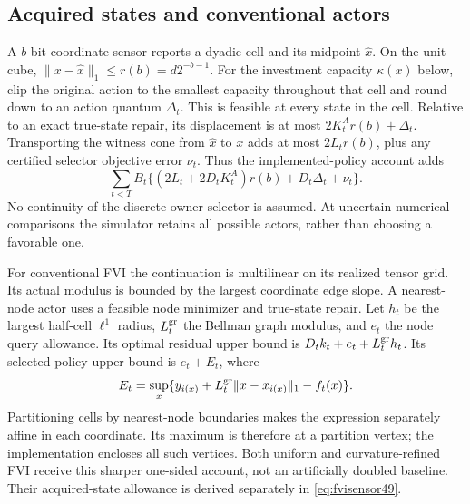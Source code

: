\subsection{Acquired states and conventional actors}
A $b$-bit coordinate sensor reports a dyadic cell and its midpoint $\widehat x$. On the unit cube, $\|x-\widehat x\|_1\le r(b)=d2^{-b-1}$. For the investment capacity $\kappa(x)$ below, clip the original action to the smallest capacity throughout that cell and round down to an action quantum $\Delta_t$. This is feasible at every state in the cell. Relative to an exact true-state repair, its displacement is at most $2K_t^Ar(b)+\Delta_t$. Transporting the witness cone from $\widehat x$ to $x$ adds at most $2L_tr(b)$, plus any certified selector objective error $\nu_t$. Thus the implemented-policy account adds
\begin{equation}\label{eq:acquire49}
 \sum_{t<T}B_t\{(2L_t+2D_tK_t^A)r(b)+D_t\Delta_t+\nu_t\}.
\end{equation}
No continuity of the discrete owner selector is assumed. At uncertain numerical comparisons the simulator retains all possible actors, rather than choosing a favorable one.

For conventional FVI the continuation is multilinear on its realized tensor grid. Its actual modulus is bounded by the largest coordinate edge slope. A nearest-node actor uses a feasible node minimizer and true-state repair. Let $h_t$ be the largest half-cell $\ell^1$ radius, $L_t^{\rm gr}$ the Bellman graph modulus, and $e_t$ the node query allowance. Its optimal residual upper bound is $D_tk_t+e_t+L_t^{\rm gr}h_t$. Its selected-policy upper bound is $e_t+E_t$, where
\[
 E_t=\sup_x\{y_{i(x)}+L_t^{\rm gr}\|x-x_{i(x)}\|_1-f_t(x)\}.
\]
Partitioning cells by nearest-node boundaries makes the expression separately affine in each coordinate. Its maximum is therefore at a partition vertex; the implementation encloses all such vertices. Both uniform and curvature-refined FVI receive this sharper one-sided account, not an artificially doubled baseline. Their acquired-state allowance is derived separately in \eqref{eq:fvisensor49}.
